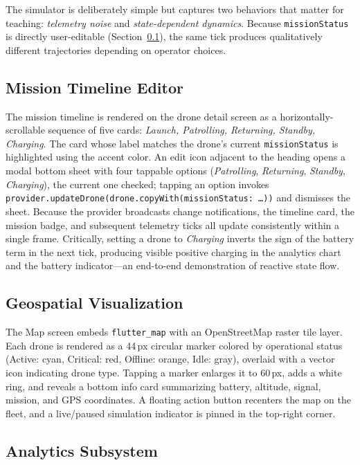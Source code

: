 \documentclass[conference]{IEEEtran}
\begin{document}
The simulator is deliberately simple but captures two behaviors that matter for teaching: \emph{telemetry noise} and \emph{state-dependent dynamics}. Because \texttt{missionStatus} is directly user-editable (Section~\ref{sec:mission}), the same tick produces qualitatively different trajectories depending on operator choices.

\subsection{Mission Timeline Editor}
\label{sec:mission}

The mission timeline is rendered on the drone detail screen as a horizontally-scrollable sequence of five cards: \emph{Launch, Patrolling, Returning, Standby, Charging}. The card whose label matches the drone's current \texttt{missionStatus} is highlighted using the accent color. An edit icon adjacent to the heading opens a modal bottom sheet with four tappable options (\emph{Patrolling}, \emph{Returning}, \emph{Standby}, \emph{Charging}), the current one checked; tapping an option invokes \texttt{provider.updateDrone(drone.copyWith(missionStatus: \dots))} and dismisses the sheet. Because the provider broadcasts change notifications, the timeline card, the mission badge, and subsequent telemetry ticks all update consistently within a single frame. Critically, setting a drone to \emph{Charging} inverts the sign of the battery term in the next tick, producing visible positive charging in the analytics chart and the battery indicator---an end-to-end demonstration of reactive state flow.

\subsection{Geospatial Visualization}

The Map screen embeds \texttt{flutter\_map} with an OpenStreetMap raster tile layer. Each drone is rendered as a 44\,px circular marker colored by operational status (Active: cyan, Critical: red, Offline: orange, Idle: gray), overlaid with a vector icon indicating drone type. Tapping a marker enlarges it to 60\,px, adds a white ring, and reveals a bottom info card summarizing battery, altitude, signal, mission, and GPS coordinates. A floating action button recenters the map on the fleet, and a live/paused simulation indicator is pinned in the top-right corner.

\subsection{Analytics Subsystem}
\end{document}
